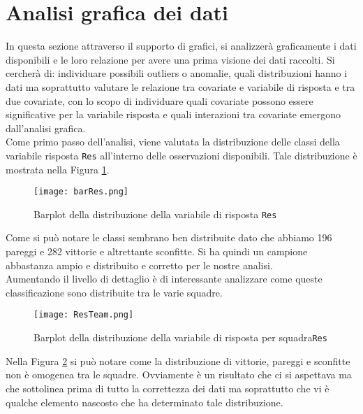 \section{Analisi grafica dei dati}
In questa sezione attraverso il supporto di grafici, si analizzerà graficamente i dati disponibili e le loro relazione per avere una prima visione dei dati raccolti. Si cercherà di: individuare possibili outliers o anomalie, quali distribuzioni hanno i dati ma soprattutto valutare le relazione tra covariate e variabile di risposta e tra due covariate, con lo scopo di individuare quali covariate possono essere significative per la variabile risposta e quali interazioni tra covariate emergono dall'analisi grafica.\\

Come primo passo dell'analisi, viene valutata la distribuzione delle classi della variabile risposta \texttt{Res} all'interno delle osservazioni disponibili. Tale distribuzione è mostrata nella Figura \ref{fig:res}.

\begin{figure}[htbp]
	\begin{center}
		\texttt{[image: barRes.png]}
		\caption{Barplot della distribuzione della variabile di risposta \texttt{Res}} \label{fig:res}
	\end{center}
\end{figure}

Come si può notare le classi sembrano ben distribuite dato che abbiamo 196 pareggi e 282 vittorie e altrettante sconfitte. Si ha quindi un campione abbastanza ampio e distribuito e corretto per le nostre analisi.\\

Aumentando il livello di dettaglio è di interessante analizzare come queste classificazione sono distribuite tra le varie squadre.

\begin{figure}[htbp]
	\begin{center}
		\texttt{[image: ResTeam.png]}
		\caption{Barplot della distribuzione della variabile di risposta per squadra\texttt{Res}} \label{fig:team}
	\end{center}
\end{figure}

Nella Figura \ref{fig:team} si può notare come la distribuzione di vittorie, pareggi e sconfitte non è omogenea tra le squadre. Ovviamente è un risultato che ci si aspettava ma che sottolinea prima di tutto la correttezza dei dati ma soprattutto che vi è qualche elemento nascosto che ha determinato tale distribuzione.\\

